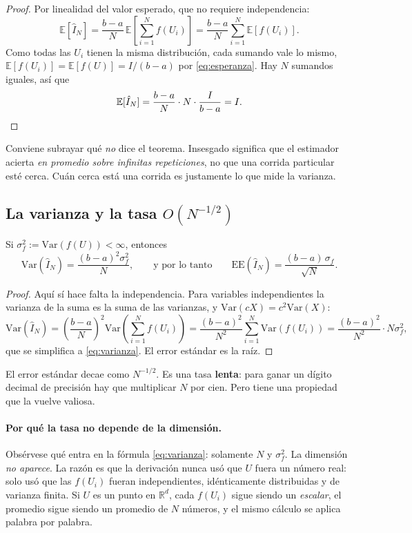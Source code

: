 \begin{proof}
Por linealidad del valor esperado, que no requiere independencia:
\[
  \mathbb{E}[\hat I_N]
  = \frac{b-a}{N}\, \mathbb{E}\!\left[\sum_{i=1}^{N} f(U_i)\right]
  = \frac{b-a}{N} \sum_{i=1}^{N} \mathbb{E}[f(U_i)].
\]
Como todas las $U_i$ tienen la misma distribución, cada sumando vale lo mismo,
$\mathbb{E}[f(U_i)] = \mathbb{E}[f(U)] = I/(b-a)$ por \eqref{eq:esperanza}.
Hay $N$ sumandos iguales, así que
\[
  \mathbb{E}[\hat I_N] = \frac{b-a}{N} \cdot N \cdot \frac{I}{b-a} = I. \qedhere
\]
\end{proof}

Conviene subrayar qué \emph{no} dice el teorema. Insesgado significa que el
estimador acierta \emph{en promedio sobre infinitas repeticiones}, no que una
corrida particular esté cerca. Cuán cerca está una corrida es justamente lo que
mide la varianza.

\subsection{La varianza y la tasa $O(N^{-1/2})$}

\begin{teorema}
\label{teo:varianza}
Si $\sigma_f^2 := \mathrm{Var}(f(U)) < \infty$, entonces
\begin{equation}
  \mathrm{Var}(\hat I_N) = \frac{(b-a)^2 \sigma_f^2}{N},
  \qquad\text{y por lo tanto}\qquad
  \mathrm{EE}(\hat I_N) = \frac{(b-a)\,\sigma_f}{\sqrt{N}} .
  \label{eq:varianza}
\end{equation}
\end{teorema}

\begin{proof}
Aquí sí hace falta la independencia. Para variables independientes la varianza
de la suma es la suma de las varianzas, y $\mathrm{Var}(cX) = c^2\mathrm{Var}(X)$:
\[
  \mathrm{Var}(\hat I_N)
  = \left(\frac{b-a}{N}\right)^{\!2} \mathrm{Var}\!\left(\sum_{i=1}^{N} f(U_i)\right)
  = \frac{(b-a)^2}{N^2} \sum_{i=1}^{N} \mathrm{Var}(f(U_i))
  = \frac{(b-a)^2}{N^2} \cdot N\sigma_f^2 ,
\]
que se simplifica a \eqref{eq:varianza}. El error estándar es la raíz.
\end{proof}

El error estándar decae como $N^{-1/2}$. Es una tasa \textbf{lenta}: para
ganar un dígito decimal de precisión hay que multiplicar $N$ por cien. Pero
tiene una propiedad que la vuelve valiosa.

\paragraph{Por qué la tasa no depende de la dimensión.} Obsérvese qué entra en
la fórmula \eqref{eq:varianza}: solamente $N$ y $\sigma_f^2$. La dimensión
\emph{no aparece}. La razón es que la derivación nunca usó que $U$ fuera un
número real: solo usó que las $f(U_i)$ fueran independientes, idénticamente
distribuidas y de varianza finita. Si $U$ es un punto en $\mathbb{R}^d$, cada
$f(U_i)$ sigue siendo un \emph{escalar}, el promedio sigue siendo un promedio
de $N$ números, y el mismo cálculo se aplica palabra por palabra.

